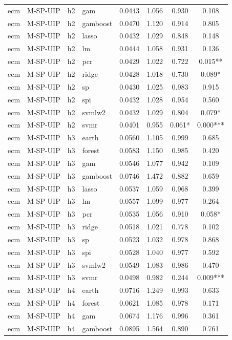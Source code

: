 \begin{ThreePartTable}
\begin{longtable}[t]{llclcccc}
ecm & M-SP-UIP & h2 & gam & 0.0443 & 1.056 & 0.930 & 0.108\\
ecm & M-SP-UIP & h2 & gamboost & 0.0470 & 1.120 & 0.914 & 0.805\\
ecm & M-SP-UIP & h2 & lasso & 0.0432 & 1.029 & 0.848 & 0.148\\
ecm & M-SP-UIP & h2 & lm & 0.0444 & 1.058 & 0.931 & 0.136\\
ecm & M-SP-UIP & h2 & pcr & 0.0429 & 1.022 & 0.722 & 0.015**\\
ecm & M-SP-UIP & h2 & ridge & 0.0428 & 1.018 & 0.730 & 0.089*\\
ecm & M-SP-UIP & h2 & sp & 0.0430 & 1.025 & 0.983 & 0.915\\
ecm & M-SP-UIP & h2 & spi & 0.0432 & 1.028 & 0.954 & 0.560\\
ecm & M-SP-UIP & h2 & svmlw2 & 0.0432 & 1.029 & 0.804 & 0.079*\\
ecm & M-SP-UIP & h2 & svmr & 0.0401 & 0.955 & 0.061* & 0.000***\\
\addlinespace
ecm & M-SP-UIP & h3 & earth & 0.0560 & 1.105 & 0.999 & 0.685\\
ecm & M-SP-UIP & h3 & forest & 0.0583 & 1.150 & 0.985 & 0.420\\
ecm & M-SP-UIP & h3 & gam & 0.0546 & 1.077 & 0.942 & 0.109\\
ecm & M-SP-UIP & h3 & gamboost & 0.0746 & 1.472 & 0.882 & 0.659\\
ecm & M-SP-UIP & h3 & lasso & 0.0537 & 1.059 & 0.968 & 0.399\\
ecm & M-SP-UIP & h3 & lm & 0.0557 & 1.099 & 0.977 & 0.264\\
ecm & M-SP-UIP & h3 & pcr & 0.0535 & 1.056 & 0.910 & 0.058*\\
ecm & M-SP-UIP & h3 & ridge & 0.0518 & 1.021 & 0.778 & 0.102\\
ecm & M-SP-UIP & h3 & sp & 0.0523 & 1.032 & 0.978 & 0.868\\
ecm & M-SP-UIP & h3 & spi & 0.0528 & 1.040 & 0.977 & 0.592\\
ecm & M-SP-UIP & h3 & svmlw2 & 0.0549 & 1.083 & 0.986 & 0.470\\
ecm & M-SP-UIP & h3 & svmr & 0.0498 & 0.982 & 0.244 & 0.009***\\
\addlinespace
ecm & M-SP-UIP & h4 & earth & 0.0716 & 1.249 & 0.993 & 0.633\\
ecm & M-SP-UIP & h4 & forest & 0.0621 & 1.085 & 0.978 & 0.171\\
ecm & M-SP-UIP & h4 & gam & 0.0674 & 1.176 & 0.996 & 0.361\\
ecm & M-SP-UIP & h4 & gamboost & 0.0895 & 1.564 & 0.890 & 0.761\\

\end{longtable}
\end{ThreePartTable}
